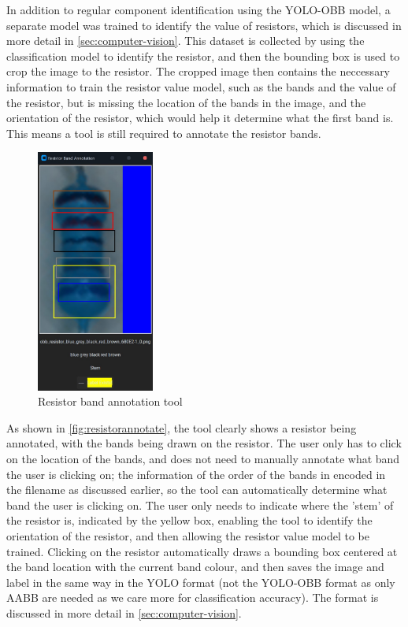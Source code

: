 In addition to regular component identification using the YOLO-OBB model, a separate model was trained to identify the value of resistors, which is discussed in more detail in \autoref{sec:computer-vision}. This dataset is collected by using the classification model to identify the resistor, and then the bounding box is used to crop the image to the resistor. The cropped image then contains the neccessary information to train the resistor value model, such as the bands and the value of the resistor, but is missing the location of the bands in the image, and the orientation of the resistor, which would help it determine what the first band is. This means a tool is still required to annotate the resistor bands.

\begin{figure}[H]
    \hfill
    \begin{minipage}[t]{\textwidth}
      \centering
      \includegraphics[height=8cm]{imgs/python/resistorannotate.jpg}
        \caption{Resistor band annotation tool}
        \label{fig:resistorannotate}
    \end{minipage}
\end{figure}

As shown in \autoref{fig:resistorannotate}, the tool clearly shows a resistor being annotated, with the bands being drawn on the resistor. The user only has to click on the location of the bands, and does not need to manually annotate what band the user is clicking on; the information of the order of the bands in encoded in the filename as discussed earlier, so the tool can automatically determine what band the user is clicking on. The user only needs to indicate where the 'stem' of the resistor is, indicated by the yellow box, enabling the tool to identify the orientation of the resistor, and then allowing the resistor value model to be trained. Clicking on the resistor automatically draws a bounding box centered at the band location with the current band colour, and then saves the image and label in the same way in the YOLO format (not the YOLO-OBB format as only AABB are needed as we care more for classification accuracy). The format is discussed in more detail in \autoref{sec:computer-vision}. 

